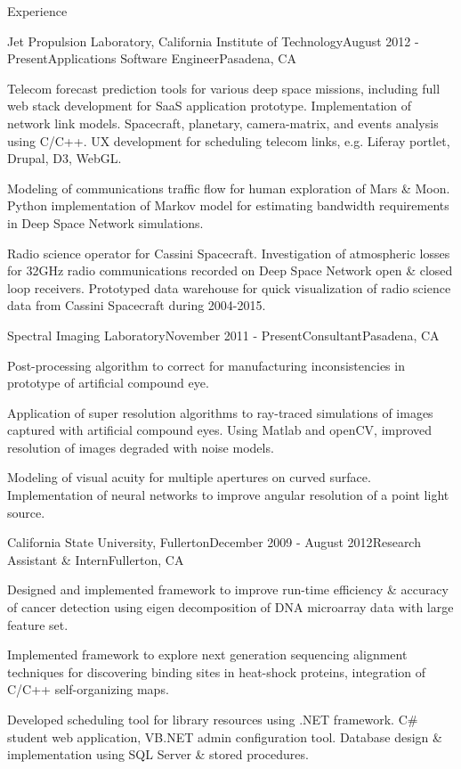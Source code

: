 \documentclass{resume} %
\begin{document}
\begin{rSection}{Experience}
\begin{rSubsection}{Jet Propulsion Laboratory, California Institute of Technology}{August 2012 - Present}{Applications Software Engineer}{Pasadena, CA}
\item Telecom forecast prediction tools for various deep space missions, including full web stack development for SaaS application prototype. Implementation of network link models. Spacecraft, planetary, camera-matrix, and events analysis using C/C++. UX development for scheduling telecom links, e.g. Liferay portlet, Drupal, D3, WebGL. 
\item Modeling of communications traffic flow for human exploration of Mars \& Moon. Python implementation of Markov model for estimating bandwidth requirements in Deep Space Network simulations. 
\item Radio science operator for Cassini Spacecraft. Investigation of atmospheric losses for 32GHz radio communications recorded on Deep Space Network open \& closed loop receivers. Prototyped data warehouse for quick visualization of radio science data from Cassini Spacecraft during 2004-2015. 
\end{rSubsection}


\begin{rSubsection}{Spectral Imaging Laboratory}{November 2011 - Present}{Consultant}{Pasadena, CA}
\item Post-processing algorithm to correct for manufacturing inconsistencies in prototype of artificial compound eye.
\item Application of super resolution algorithms to ray-traced simulations of images captured with artificial compound eyes. Using Matlab and openCV, improved resolution of images degraded with noise models.
\item Modeling of visual acuity for multiple apertures on curved surface. Implementation of neural networks to improve angular resolution of a point light source. 
\end{rSubsection}




\begin{rSubsection}{California State University, Fullerton}{December 2009 - August 2012}{Research Assistant \& Intern}{Fullerton, CA}
\item Designed and implemented framework to improve run-time efficiency \& accuracy of cancer detection using eigen decomposition of DNA microarray data with large feature set.
\item Implemented framework to explore next generation sequencing alignment techniques for discovering binding sites in heat-shock proteins, integration of C/C++ self-organizing maps.
\item Developed scheduling tool for library resources using .NET framework. C\# student web application, VB.NET admin configuration tool. Database design \& implementation using SQL Server \& stored procedures.
\end{rSubsection}
\end{rSection}
\end{document}
